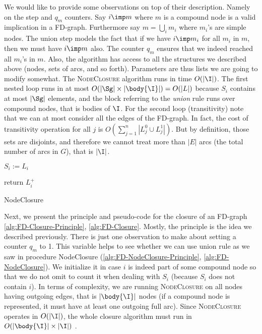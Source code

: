 We would like to provide some observations on top of their description. Namely 
on the  step and $q_m$ counters. Say $i \imp m$ where $m$ is a 
compound node is a valid implication in a FD-graph. Furthermore say $m = 
\bigcup_i m_i$ where $m_i$'s are simple nodes. The union step models the fact 
that if we have $i \imp m_i$ for all $m_i$ in $m$, then we must have $i \imp m$ 
also. The counter $q_m$ ensures that we indeed reached all $m_i$'s in $m$. 
Also, the algorithm has access to all the structures we described above (nodes, 
sets of arcs, and so forth). Parameters are thus lists we are going to modify 
somewhat. The \textsc{NodeClosure} algorithm runs in time $O(|\I|)$. The first 
nested loop runs in at most $O(|\Sg| \times |\body{\I}|) = O(|L|)$ because 
$S_i$ contains at most $|\Sg|$ elements, and the block referring to the 
\textit{union} rule runs over compound nodes, that is bodies of $\I$. For the 
second loop (transitivity) note that we can at most consider all the edges of 
the FD-graph. In fact, the cost of transitivity operation for all $j$ is 
$O(\sum_{j = 1}^n |L_j^0 \cup L_j^1 |)$. But by definition, those sets are 
disjoints, and therefore we cannot treat more than $| E |$ arcs (the total 
number of arcs in $G$), that is $|\I|$.

\begin{algorithm}

\BlankLine
\BlankLine	

$S_i := L_i$ \;

return $L_i^+$ \;
\caption{NodeClosure}
\label{alg:FD-NodeClosure}
\end{algorithm}

\vspace{1.2em}

Next, we present the principle and pseudo-code for the closure of an FD-graph
\ref{alg:FD-Closure-Principle}, \ref{alg:FD-Closure}. Mostly, the principle is 
the idea we described previously. There is just one observation to make about 
setting a counter $q_m$ to 1. This variable helps to see whether we can use 
union rule as we saw in procedure NodeClosure 
(\ref{alg:FD-NodeClosure-Principle}, \ref{alg:FD-NodeClosure}). We initialize it
in case $i$ is indeed part of some compound node so that we do not omit to count
it when dealing with $S_i$ (because $S_i$ does not contain $i$). In terms of
complexity, we are running \textsc{NodeClosure} on all nodes having outgoing
edges, that is $|\body{\I}|$ nodes (if a compound node is represented, it must
have at least one outgoing full arc). Since \textsc{NodeClosure} operates in
$O(|\I|)$, the whole closure algorithm must run in $O(|\body{\I}| \times |\I|)$
.

